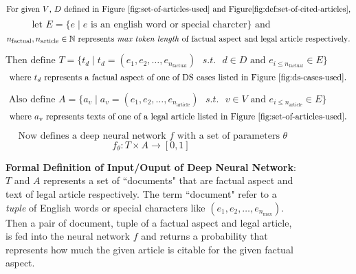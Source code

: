 \begin{figure}[ht]
    \[\text{For given $V$, $D$ defined in Figure \ref{fig:set-of-articles-used} and  Figure\ref{fig:def:set-of-cited-articles},}\]
    \[\text{ let } E = \{e \mid e \text{ is an english word or special charcter} \} \text{ and }\]
    \[n_{\text{factual}}, n_{\text{article}} \in \Bbb N \text{ represents \textit{max token length} of factual aspect and legal article respectively}. \]
    
    \[\text{Then define } T = \{t_d \mid t_d = (e_1, e_2, \ldots , e_{n_\text{factual}}) \text{ } s.t. \text{ } d \in D \text{ and } e_{i \le{n_{\text{factual}}}  } \in E \} \]
    \[\text{ where } t_d \text{ represents a factual aspect of one of DS cases listed in Figure \ref{fig:ds-cases-used}. }\]
    
    \[\text{ Also define } A = \{a_v \mid a_v = (e_1, e_2, \ldots , e_{n_\text{article}}) \text{ } s.t. \text{ } v \in V \text{ and } e_{i \le{n_{\text{article}}}  } \in E \}  \]
    \[\text{ where } a_v \text{ represents texts of one of a legal article listed in Figure \ref{fig:set-of-articles-used}. }\]

    \[\text{ Now defines a deep neural network } f \text{ with a set of parameters } \theta \]
    \[f_{\theta}: T \times A \to [0, 1] \]


    \caption{\textbf{Formal Definition of Input/Ouput of Deep Neural Network}: $T$ and $A$ represents a set of ``documents" that are factual aspect and text of legal article respectively. The term ``document" refer to a \textit{tuple} of English words or special characters like $(e_1, e_2, \ldots, e_{n_\text{max}})$. Then a pair of document, tuple of a factual aspect and legal article, is fed into the neural network $f$ and returns a probability that represents how much the given article is citable for the given factual aspect.}
    \label{fig:def:io:nn}

\end{figure}
